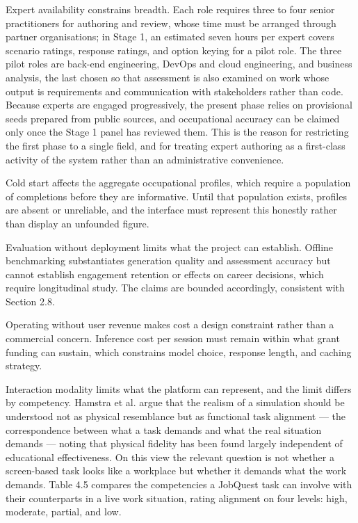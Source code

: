 Expert availability constrains breadth. Each role requires three to four senior practitioners for authoring and review, whose time must be arranged through partner organisations; in Stage 1, an estimated seven hours per expert covers scenario ratings, response ratings, and option keying for a pilot role. The three pilot roles are back-end engineering, DevOps and cloud engineering, and business analysis, the last chosen so that assessment is also examined on work whose output is requirements and communication with stakeholders rather than code. Because experts are engaged progressively, the present phase relies on provisional seeds prepared from public sources, and occupational accuracy can be claimed only once the Stage 1 panel has reviewed them. This is the reason for restricting the first phase to a single field, and for treating expert authoring as a first-class activity of the system rather than an administrative convenience.

Cold start affects the aggregate occupational profiles, which require a population of completions before they are informative. Until that population exists, profiles are absent or unreliable, and the interface must represent this honestly rather than display an unfounded figure.

Evaluation without deployment limits what the project can establish. Offline benchmarking substantiates generation quality and assessment accuracy but cannot establish engagement retention or effects on career decisions, which require longitudinal study. The claims are bounded accordingly, consistent with Section 2.8.

Operating without user revenue makes cost a design constraint rather than a commercial concern. Inference cost per session must remain within what grant funding can sustain, which constrains model choice, response length, and caching strategy.

Interaction modality limits what the platform can represent, and the limit differs by competency. Hamstra et al.\cite{r98} argue that the realism of a simulation should be understood not as physical resemblance but as functional task alignment --- the correspondence between what a task demands and what the real situation demands --- noting that physical fidelity has been found largely independent of educational effectiveness. On this view the relevant question is not whether a screen-based task looks like a workplace but whether it demands what the work demands. Table 4.5 compares the competencies a JobQuest task can involve with their counterparts in a live work situation, rating alignment on four levels: high, moderate, partial, and low.

